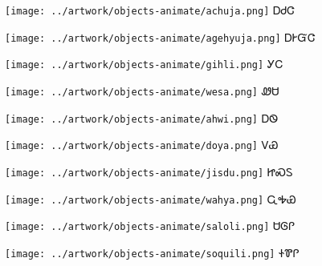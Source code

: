 \documentclass[avery5371]{flashcards}%
\begin{document}
\begin{flashcard}{
\texttt{[image: ../artwork/objects-animate/achuja.png]}
}
\Huge ᎠᏧᏣ
\end{flashcard}

\begin{flashcard}{
\texttt{[image: ../artwork/objects-animate/agehyuja.png]}
}
\Huge ᎠᎨᏳᏣ
\end{flashcard}


\begin{flashcard}{
\texttt{[image: ../artwork/objects-animate/gihli.png]}
}
\Huge ᎩᏟ
\end{flashcard}

\begin{flashcard}{
\texttt{[image: ../artwork/objects-animate/wesa.png]}
}
\Huge ᏪᏌ
\end{flashcard}

\begin{flashcard}{
\texttt{[image: ../artwork/objects-animate/ahwi.png]}
}
\Huge ᎠᏫ
\end{flashcard}

\begin{flashcard}{
\texttt{[image: ../artwork/objects-animate/doya.png]}
}
\Huge ᏙᏯ
\end{flashcard}

\begin{flashcard}{
\texttt{[image: ../artwork/objects-animate/jisdu.png]}
}
\Huge ᏥᏍᏚ
\end{flashcard}
\begin{flashcard}{
\texttt{[image: ../artwork/objects-animate/wahya.png]}
}
\Huge ᏩᎭᏯ
\end{flashcard}

\begin{flashcard}{
\texttt{[image: ../artwork/objects-animate/saloli.png]}
}
\Huge ᏌᎶᎵ
\end{flashcard}

\begin{flashcard}{
\texttt{[image: ../artwork/objects-animate/soquili.png]}
}
\Huge ᏐᏈᎵ
\end{flashcard}
\end{document}
